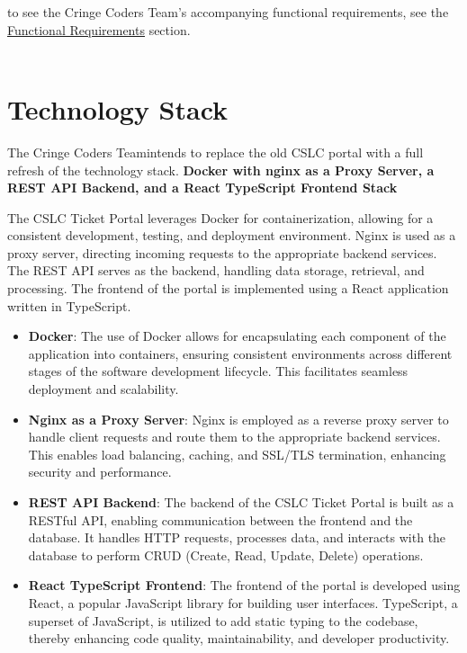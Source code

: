\documentclass[oneside,openany,obeyspaces]{book}
\newcommand\tab[1][1cm]{\hspace*{#1}}
\newcommand\TeamName{Cringe Coders Team}
\begin{document}
\begin{flushleft}
    \tab to see the \TeamName's accompanying functional requirements, see the \hyperref[sec:Functional Requirements]{Functional Requirements} section.\\~\\


    \section{Technology Stack}

    \tab The \TeamName\space intends to replace the old CSLC portal with a full refresh of the technology stack.
    \textbf{Docker with nginx as a Proxy Server, a REST API Backend, and a React TypeScript Frontend Stack}

    The CSLC Ticket Portal leverages Docker for containerization, allowing for a consistent development, testing, and deployment environment. Nginx is used as a proxy server, directing incoming requests to the appropriate backend services. The REST API serves as the backend, handling data storage, retrieval, and processing. The frontend of the portal is implemented using a React application written in TypeScript.

    \begin{itemize}
        \item \textbf{Docker}: The use of Docker allows for encapsulating each component of the application into containers, ensuring consistent environments across different stages of the software development lifecycle. This facilitates seamless deployment and scalability.

        \item \textbf{Nginx as a Proxy Server}: Nginx is employed as a reverse proxy server to handle client requests and route them to the appropriate backend services. This enables load balancing, caching, and SSL/TLS termination, enhancing security and performance.

        \item \textbf{REST API Backend}: The backend of the CSLC Ticket Portal is built as a RESTful API, enabling communication between the frontend and the database. It handles HTTP requests, processes data, and interacts with the database to perform CRUD (Create, Read, Update, Delete) operations.

        \item \textbf{React TypeScript Frontend}: The frontend of the portal is developed using React, a popular JavaScript library for building user interfaces. TypeScript, a superset of JavaScript, is utilized to add static typing to the codebase, thereby enhancing code quality, maintainability, and developer productivity.
    \end{itemize}


\end{flushleft}
\end{document}
